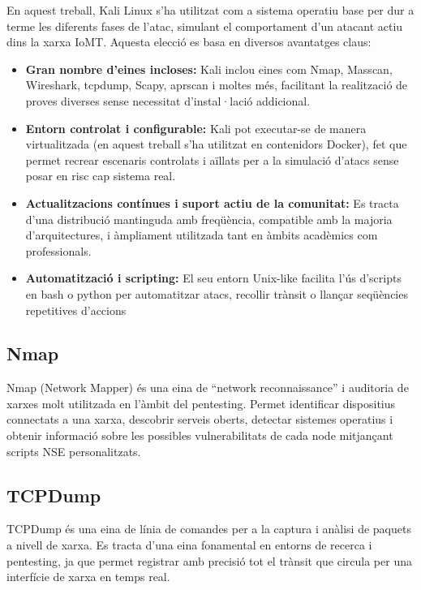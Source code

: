     En aquest treball, Kali Linux s’ha utilitzat com a sistema operatiu base per dur a terme les diferents fases de l’atac, simulant el comportament d’un atacant actiu dins la xarxa IoMT. Aquesta elecció es basa en diversos avantatges claus:
    \begin{itemize}
      \item \textbf{Gran nombre d’eines incloses:} Kali inclou eines com Nmap, Masscan, Wireshark, tcpdump, Scapy, aprscan i moltes més, facilitant la realització de proves diverses sense necessitat d’instal·lació addicional.
      \item \textbf{Entorn controlat i configurable:} Kali pot executar-se de manera virtualitzada (en aquest treball s'ha utilitzat en contenidors Docker), fet que permet recrear escenaris controlats i aïllats per a la simulació d’atacs sense posar en risc cap sistema real.
      \item \textbf{Actualitzacions contínues i suport actiu de la comunitat:} Es tracta d’una distribució mantinguda amb freqüència, compatible amb la majoria d’arquitectures, i àmpliament utilitzada tant en àmbits acadèmics com professionals.
      \item \textbf{Automatització i scripting:} El seu entorn Unix-like facilita l’ús d’scripts en bash o python per automatitzar atacs, recollir trànsit o llançar seqüències repetitives d’accions
    \end{itemize}  

    \subsection{Nmap}
    Nmap (Network Mapper) és una eina de “network reconnaissance” i auditoria de xarxes molt utilitzada en l’àmbit del pentesting. Permet identificar dispositius connectats a una xarxa, descobrir serveis oberts, detectar sistemes operatius i obtenir informació sobre les possibles vulnerabilitats de cada node mitjançant scripts NSE personalitzats. \cite{Nmapexp}

    \subsection{TCPDump}
    TCPDump és una eina de línia de comandes per a la captura i anàlisi de paquets a nivell de xarxa. Es tracta d’una eina fonamental en entorns de recerca i pentesting, ja que permet registrar amb precisió tot el trànsit que circula per una interfície de xarxa en temps real. \cite{wtfexp}
    
